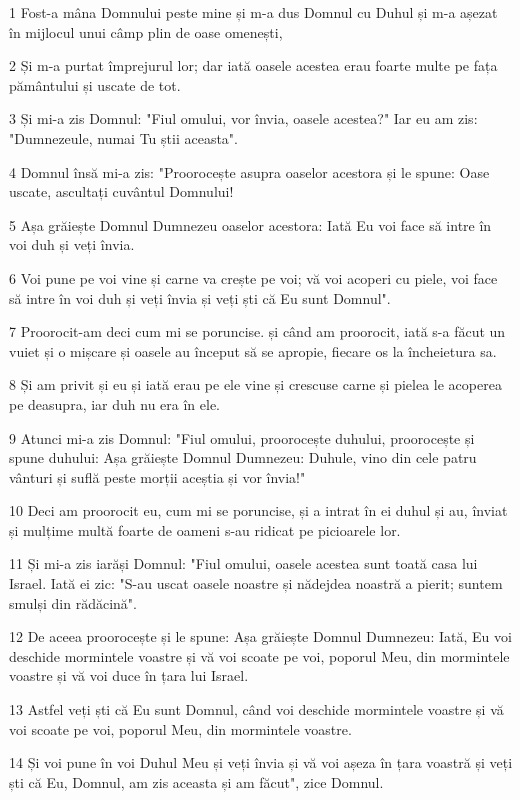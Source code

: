 \par 1 Fost-a mâna Domnului peste mine și m-a dus Domnul cu Duhul și m-a așezat în mijlocul unui câmp plin de oase omenești,
\par 2 Și m-a purtat împrejurul lor; dar iată oasele acestea erau foarte multe pe fața pământului și uscate de tot.
\par 3 Și mi-a zis Domnul: "Fiul omului, vor învia, oasele acestea?" Iar eu am zis: "Dumnezeule, numai Tu știi aceasta".
\par 4 Domnul însă mi-a zis: "Proorocește asupra oaselor acestora și le spune: Oase uscate, ascultați cuvântul Domnului!
\par 5 Așa grăiește Domnul Dumnezeu oaselor acestora: Iată Eu voi face să intre în voi duh și veți învia.
\par 6 Voi pune pe voi vine și carne va crește pe voi; vă voi acoperi cu piele, voi face să intre în voi duh și veți învia și veți ști că Eu sunt Domnul".
\par 7 Proorocit-am deci cum mi se poruncise. și când am proorocit, iată s-a făcut un vuiet și o mișcare și oasele au început să se apropie, fiecare os la încheietura sa.
\par 8 Și am privit și eu și iată erau pe ele vine și crescuse carne și pielea le acoperea pe deasupra, iar duh nu era în ele.
\par 9 Atunci mi-a zis Domnul: "Fiul omului, proorocește duhului, proorocește și spune duhului: Așa grăiește Domnul Dumnezeu: Duhule, vino din cele patru vânturi și suflă peste morții aceștia și vor învia!"
\par 10 Deci am proorocit eu, cum mi se poruncise, și a intrat în ei duhul și au, înviat și mulțime multă foarte de oameni s-au ridicat pe picioarele lor.
\par 11 Și mi-a zis iarăși Domnul: "Fiul omului, oasele acestea sunt toată casa lui Israel. Iată ei zic: "S-au uscat oasele noastre și nădejdea noastră a pierit; suntem smulși din rădăcină".
\par 12 De aceea proorocește și le spune: Așa grăiește Domnul Dumnezeu: Iată, Eu voi deschide mormintele voastre și vă voi scoate pe voi, poporul Meu, din mormintele voastre și vă voi duce în țara lui Israel.
\par 13 Astfel veți ști că Eu sunt Domnul, când voi deschide mormintele voastre și vă voi scoate pe voi, poporul Meu, din mormintele voastre.
\par 14 Și voi pune în voi Duhul Meu și veți învia și vă voi așeza în țara voastră și veți ști că Eu, Domnul, am zis aceasta și am făcut", zice Domnul.
